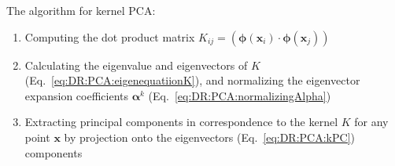 The algorithm for kernel PCA:
\begin{enumerate}
	\item Computing the dot product matrix $K_{ij} =(\boldsymbol{\phi}(\mathbf{x}_i)\cdot \boldsymbol{\phi}(\mathbf{x}_j))$
	\item Calculating the eigenvalue and eigenvectors of $K$ (Eq.~\ref{eq:DR:PCA:eigenequatiionK}), and normalizing the eigenvector expansion coefficients $\boldsymbol{\alpha}^k$ (Eq.~\ref{eq:DR:PCA:normalizingAlpha})
	\item Extracting principal components in correspondence to the kernel $K$ for any point $\mathbf{x}$ by projection onto the eigenvectors (Eq.~\ref{eq:DR:PCA:kPC})
	components
\end{enumerate}
 